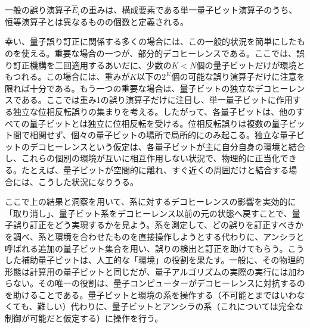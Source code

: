\hypertarget{srcpage:311}{}\label{srcpage:311}
一般の誤り演算子$\hat E_i$の重みは、構成要素である単一量子ビット演算子のうち、恒等演算子とは異なるものの個数と定義される。

幸い、量子誤り訂正に関係する多くの場合には、この一般的状況を簡単にしたものを使える。重要な場合の一つが、部分的デコヒーレンスである。ここでは、誤り訂正機構を二回適用するあいだに、少数の$K<N$個の量子ビットだけが環境ともつれる。この場合には、重みが$K$以下の$2^K$個の可能な誤り演算子だけに注意を限れば十分である。もう一つの重要な場合は、量子ビットの独立なデコヒーレンスである。ここでは重み1の誤り演算子だけに注目し、単一量子ビットに作用する独立な位相反転誤りの集まりを考える。したがって、各量子ビットは、他のすべての量子ビットとは独立に位相反転を受ける。位相反転誤りは複数の量子ビット間で相関せず、個々の量子ビットの場所で局所的にのみ起こる。独立な量子ビットのデコヒーレンスという仮定は、各量子ビットが主に自分自身の環境と結合し、これらの個別の環境が互いに相互作用しない状況で、物理的に正当化できる。たとえば、量子ビットが空間的に離れ、すぐ近くの周囲だけと結合する場合には、こうした状況になりうる。

ここで上の結果と洞察を用いて、系に対するデコヒーレンスの影響を実効的に「取り消し」、量子ビット系をデコヒーレンス以前の元の状態へ戻すことで、量子誤り訂正をどう実現するかを見よう。系を測定して、どの誤りを訂正すべきかを調べ、系と環境を合わせたものを直接操作しようとする代わりに、アンシラと呼ばれる追加の量子ビット集合を用い、誤りの検出と訂正を助けてもらう。こうした補助量子ビットは、人工的な「環境」の役割を果たす。一般に、その物理的形態は計算用の量子ビットと同じだが、量子アルゴリズムの実際の実行には加わらない。その唯一の役割は、量子コンピューターがデコヒーレンスに対抗するのを助けることである。量子ビットと環境の系を操作する（不可能とまではいわなくても、難しい）代わりに、量子ビットとアンシラの系（これについては完全な制御が可能だと仮定する）に操作を行う。

